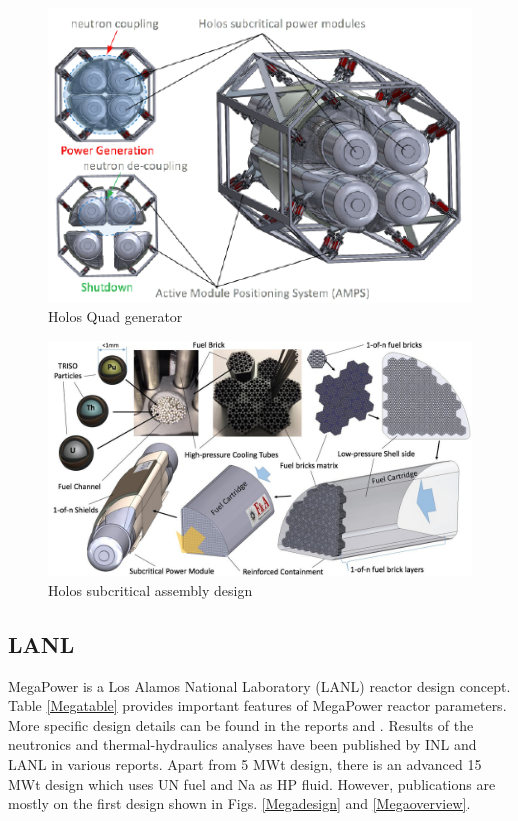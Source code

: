 \documentclass[10pt,a4paper]{article}
\begin{document}
\begin{figure}[hbtp]
\centering
\includegraphics[scale=1]{Figs/holosquad.jpeg}
\caption{Holos Quad generator}
\label{Holosquad}
\end{figure}

\begin{figure}[hbtp]
\centering
\includegraphics[scale=0.3]{Figs/holosfueldesign.jpeg}
\caption{Holos subcritical assembly design}
\label{Holosdesign}
\end{figure}

\pagebreak
\subsection{LANL}
MegaPower is a Los Alamos National Laboratory (LANL) reactor design concept. Table \ref{Megatable} provides important features of MegaPower reactor parameters. More specific design details can be found in the reports \cite{mega17} and \cite{mega15}. Results of the neutronics and thermal-hydraulics analyses have been published by INL and LANL in various reports. Apart from 5 MWt design, there is an advanced 15 MWt design which uses UN fuel and Na as HP fluid. However, publications are mostly on the first design shown in Figs. \ref{Megadesign} and \ref{Megaoverview}. 
\end{document}
